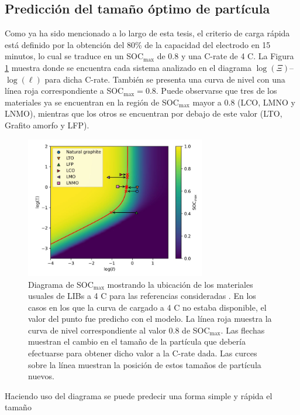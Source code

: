\subsection{Predicción del tamaño óptimo de partícula}

Como ya ha sido mencionado a lo largo de esta tesis, el criterio de carga rápida
está definido por la obtención del 80\% de la capacidad del electrodo en 15 
minutos, lo cual se traduce en un SOC$_{\max}$ de 0.8 y una C-rate de 4 C. La
Figura \ref{fig:prediccion} muestra donde se encuentra cada sistema analizado en
el diagrama $\log(\Xi)$--$\log(\ell)$ para dicha C-rate. También se presenta una
curva de nivel con una línea roja correspondiente a SOC$_{\max} = 0.8$. Puede
observarse que tres de los materiales ya se encuentran en la región de 
SOC$_{\max}$ mayor a 0.8 (LCO, LMNO y LNMO), mientras que los otros se encuentran
por debajo de este valor (LTO, Grafito amorfo y LFP).
\begin{figure}[h!]
    \centering
    \includegraphics[width=0.7\textwidth]{FastCharging/un/resultados/prediccion/prediccion.png}
    \caption{Diagrama de SOC$_{\max}$ mostrando la ubicación de los materiales 
    usuales de LIBs a 4 C para las referencias consideradas \cite{mancini2022,
    he2012, lei2015, wang2019high, bak2011, nishikawa2017}. En los casos en los 
    que la curva de cargado a 4 C no estaba disponible, el valor del punto fue 
    predicho con el modelo. La línea roja muestra la curva de nivel 
    correspondiente al valor 0.8 de SOC$_{\max}$. Las flechas muestran el cambio
    en el tamaño de la partícula que debería efectuarse para obtener dicho valor
    a la C-rate dada. Las curces sobre la línea muestran la posición de estos
    tamaños de partícula nuevos.}
    \label{fig:prediccion}
\end{figure}
Haciendo uso del diagrama se puede predecir una forma simple y rápida el tamaño 

